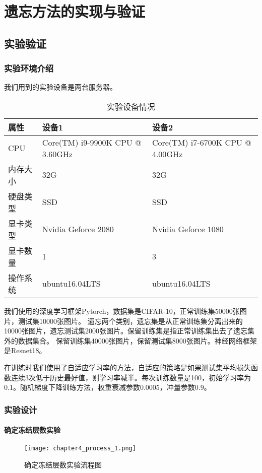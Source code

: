 
\chapter{遗忘方法的实现与验证}

\section{实验验证}

\subsection{实验环境介绍}
我们用到的实验设备是两台服务器。
\begin{table}
    \centering
    \caption{实验设备情况}
    \begin{tabular}{lll}
      \toprule
      属性  & 设备1 & 设备2  \\
      \midrule
      CPU   & Core(TM) i9-9900K CPU @ 3.60GHz & Core(TM) i7-6700K CPU @ 4.00GHz \\
      内存大小  & 32G & 32G                    \\
      硬盘类型 & SSD  & SSD  \\
      显卡类型 & Nvidia Geforce 2080  & Nvidia Geforce 1080  \\
      显卡数量 & 1  & 3  \\
      操作系统 & ubuntu16.04LTS  & ubuntu16.04LTS  \\
      \bottomrule
    \end{tabular}
    \label{tab:model-attack-difference}
\end{table}

我们使用的深度学习框架Pytorch，数据集是CIFAR-10\cite{cifar10_2009}，正常训练集50000张图片，测试集10000张图片。
遗忘两个类别，遗忘集是从正常训练集分离出来的10000张图片，遗忘测试集2000张图片。保留训练集是指正常训练集出去了遗忘集外的数据集合。
保留训练集40000张图片，保留测试集8000张图片。神经网络框架是Resnet18\cite{He_2016_CVPR}。

在训练时我们使用了自适应学习率的方法，自适应的策略是如果测试集平均损失函数连续3次低于历史最好值，则学习率减半。每次训练数量是100，初始学习率为0.1。随机梯度下降训练方法，权重衰减参数0.0005，冲量参数0.9。

\subsection{实验设计}
\subsubsection{确定冻结层数实验}
\begin{figure}
    \centering
    \texttt{[image: chapter4\_process\_1.png]}
    \caption{确定冻结层数实验流程图}
    \label{fig:chapter4_process_1}
\end{figure}

